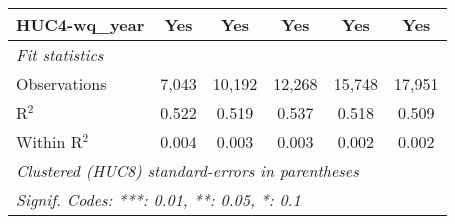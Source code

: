 \begin{tabular}{lccccc}
   HUC4-wq\_year                       & Yes             & Yes           & Yes           & Yes      & Yes\\  
   \midrule
   \emph{Fit statistics}\\
   Observations                        & 7,043           & 10,192        & 12,268        & 15,748   & 17,951\\  
   R$^2$                               & 0.522           & 0.519         & 0.537         & 0.518    & 0.509\\  
   Within R$^2$                        & 0.004           & 0.003         & 0.003         & 0.002    & 0.002\\  
   \midrule \midrule
   \multicolumn{6}{l}{\emph{Clustered (HUC8) standard-errors in parentheses}}\\
   \multicolumn{6}{l}{\emph{Signif. Codes: ***: 0.01, **: 0.05, *: 0.1}}\\
\end{tabular}
\par\endgroup


